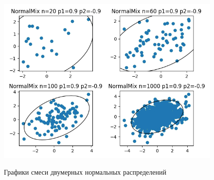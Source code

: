 \documentclass[12pt]{report}
\begin{document}
\vspace{-1cm}
\begin{figure}[H]
    \centering
    \caption{Графики смеси двумерных нормальных распределений }
    \includegraphics[scale = 0.6]{../lab_5/pic/2p.png} 
    \label{fig:dis_norm_gis4}
\end{figure}
\end{document}

